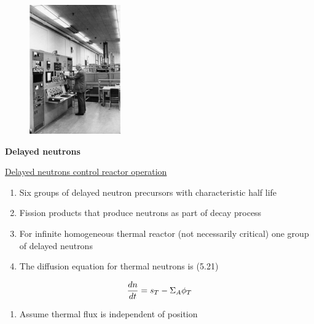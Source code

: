 \documentclass[aspectratio=1610,pdftex,dvipsnames,compress,xcolor={dvipsnames}]{beamer}
\begin{document}
\begin{frame}{}
    \begin{figure}
        \centering
        \includegraphics[width=0.35\textwidth]{wpi.control.panel.jpg}
    \end{figure}
\end{frame}


\begin{frame}[plain]{}
    \centering\LARGE\textbf{Delayed neutrons}
\end{frame}


\addtocounter{framenumber}{-1} 
\begin{frame}{\href{https://www.nrc.gov/docs/ML1214/ML12142A098.pdf}{Delayed neutrons control reactor operation}}
    \begin{enumerate}[series=outerlist,topsep=0pt,itemsep=21pt,leftmargin=*,label=(\arabic*)]
        \item[]Six groups of delayed neutron precursors with characteristic half life
        \item[]Fission products that produce neutrons as part of decay process
        \item[]For infinite homogeneous thermal reactor (not necessarily critical) one group of delayed neutrons
        \item[]The diffusion equation for thermal neutrons is (5.21)
    \end{enumerate}

    \vspace*{\fill}

    \begin{equation}
        \LARGE
        \frac{dn}{dt} = s_T - \Sigma_A \phi_T
    \end{equation}

    \vspace*{\fill}

    \begin{enumerate}[series=outerlist,topsep=0pt,itemsep=21pt,leftmargin=*,label=(\arabic*)]
        \item[]Assume thermal flux is independent of position
    \end{enumerate}
\end{frame}
\end{document}

